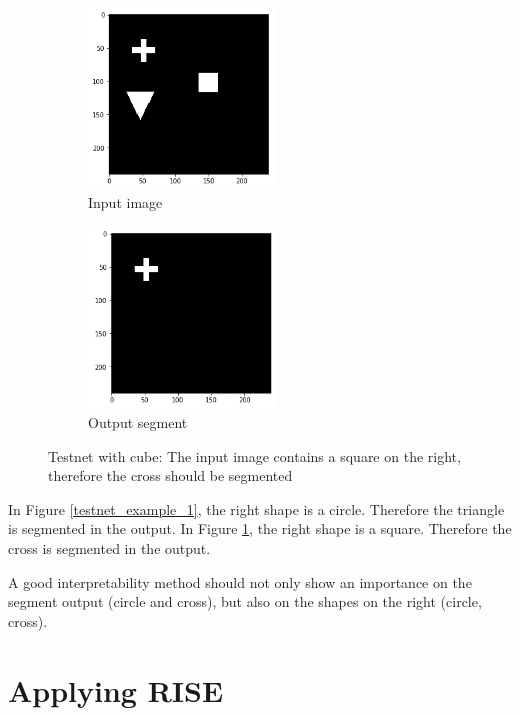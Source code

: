 \begin{figure}[H]
    \centering
    \begin{subfigure}{.5\textwidth}
        \centering
        \includegraphics[width=5cm]{chapters/05_testnet/images/testnet_b-0.png}
        \caption{Input image}
    \end{subfigure}%
    \begin{subfigure}{.5\textwidth}
        \centering
        \includegraphics[width=5cm]{chapters/05_testnet/images/testnet_b-1.png}
        \caption{Output segment}
    \end{subfigure}
    \caption{Testnet with cube: The input image contains a square on the right, therefore the cross should be segmented}
    \label{testnet_example_2}
\end{figure}

In Figure \ref{testnet_example_1}, the right shape is a circle. Therefore the triangle is segmented in the output.
In Figure \ref{testnet_example_2}, the right shape is a square. Therefore the cross is segmented in the output.

A good interpretability method should not only show an importance on the segment output (circle and cross), but also on the shapes on the right (circle, cross).

\section{Applying RISE}

